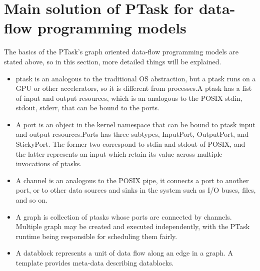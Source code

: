 \documentclass[10pt,a4paper]{ltjsarticle}       %
\begin{document}
\section{Main solution of PTask for data-flow programming models}
The basics of the PTask's graph oriented data-flow programming models are stated above, so in this section, more detailed things will be explained.\\
\begin{itemize}
\item ptask is an analogous to the traditional OS abstraction, but a ptask runs on a GPU or other accelerators, so it is different from processes.A ptask has a list of input and output resources, which is an analogous to the POSIX stdin, stdout, stderr, that can be bound to the ports.
\item A port is an object in the kernel namespace that can be bound to ptask input and output resources.Ports has three subtypes, InputPort, OutputPort, and StickyPort. The former two correspond to stdin and stdout of POSIX, and the latter represents an input which retain its value across multiple invocations of ptasks.
\item A channel is an analogous to the POSIX pipe, it connects a port to another port, or to other data sources and sinks in the system such as I/O buses, files, and so on.
\item A graph is collection of ptasks whose ports are connected by channels. Multiple graph may be created and executed independently, with the PTask runtime being responsible for scheduling them fairly.
\item A datablock represents a unit of data flow along an edge in a graph. A template provides meta-data describing datablocks. 
\end{itemize} 
\end{document}
